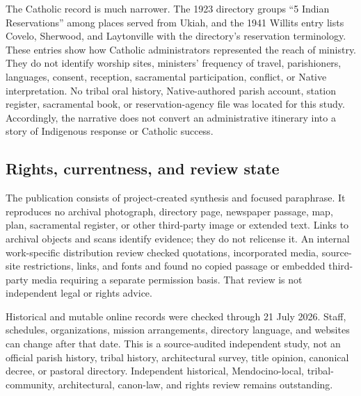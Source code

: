 The Catholic record is much narrower. The 1923 directory groups ``5 Indian Reservations'' among places served from Ukiah, and the 1941 Willits entry lists Covelo, Sherwood, and Laytonville with the directory's reservation terminology. These entries show how Catholic administrators represented the reach of ministry. They do not identify worship sites, ministers' frequency of travel, parishioners, languages, consent, reception, sacramental participation, conflict, or Native interpretation. No tribal oral history, Native-authored parish account, station register, sacramental book, or reservation-agency file was located for this study. Accordingly, the narrative does not convert an administrative itinerary into a story of Indigenous response or Catholic success.

\subsection{Rights, currentness, and review state}

The publication consists of project-created synthesis and focused paraphrase. It reproduces no archival photograph, directory page, newspaper passage, map, plan, sacramental register, or other third-party image or extended text. Links to archival objects and scans identify evidence; they do not relicense it. An internal work-specific distribution review checked quotations, incorporated media, source-site restrictions, links, and fonts and found no copied passage or embedded third-party media requiring a separate permission basis. That review is not independent legal or rights advice.

Historical and mutable online records were checked through 21 July 2026. Staff, schedules, organizations, mission arrangements, directory language, and websites can change after that date. This is a source-audited independent study, not an official parish history, tribal history, architectural survey, title opinion, canonical decree, or pastoral directory. Independent historical, Mendocino-local, tribal-community, architectural, canon-law, and rights review remains outstanding.
